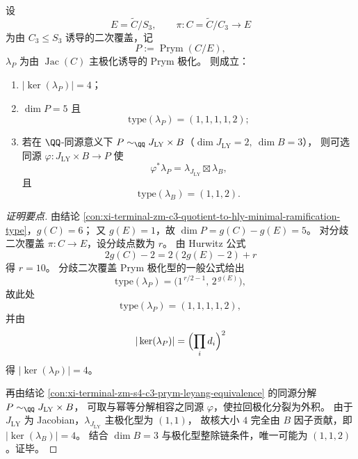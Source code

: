 \begin{conclusion}\label{con:xi-terminal-zm-prym-polarization-type-rigidity-11112}
设
\[
E=\widetilde{C}/S_3,\qquad
\pi:C=\widetilde{C}/C_3\longrightarrow E
\]
为由 \(C_3\le S_3\) 诱导的二次覆盖，记
\[
P:=\operatorname{Prym}(C/E),
\]
\(\lambda_P\) 为由 \(\operatorname{Jac}(C)\) 主极化诱导的 Prym 极化。
则成立：
\begin{enumerate}
  \item \(|\ker(\lambda_P)|=4\)；
  \item \(\dim P=5\) 且
  \[
  \mathrm{type}(\lambda_P)=(1,1,1,1,2);
  \]
  \item 若在 \(\QQ\)-同源意义下 \(P\sim_{\QQ}J_{\mathrm{LY}}\times B\)（\(\dim J_{\mathrm{LY}}=2,\ \dim B=3\)），
  则可选同源 \(\varphi:J_{\mathrm{LY}}\times B\to P\) 使
  \[
  \varphi^*\lambda_P=\lambda_{J_{\mathrm{LY}}}\boxtimes \lambda_B,
  \]
  且
  \[
  \mathrm{type}(\lambda_B)=(1,1,2).
  \]
\end{enumerate}
\end{conclusion}
\begin{proof}[证明要点]
由结论 \ref{con:xi-terminal-zm-c3-quotient-to-hly-minimal-ramification-type}，\(g(C)=6\)；
又 \(g(E)=1\)，故 \(\dim P=g(C)-g(E)=5\)。
对分歧二次覆盖 \(\pi:C\to E\)，设分歧点数为 \(r\)。
由 Hurwitz 公式
\[
2g(C)-2=2(2g(E)-2)+r
\]
得 \(r=10\)。
分歧二次覆盖 Prym 极化型的一般公式给出
\[
\mathrm{type}(\lambda_P)=\bigl(1^{\,r/2-1},\,2^{\,g(E)}\bigr),
\]
故此处
\[
\mathrm{type}(\lambda_P)=(1,1,1,1,2),
\]
并由
\[
|\ker(\lambda_P)|=\Bigl(\prod_i d_i\Bigr)^2
\]
得 \(|\ker(\lambda_P)|=4\)。

再由结论 \ref{con:xi-terminal-zm-s4-c3-prym-leyang-equivalence} 的同源分解
\(
P\sim_{\QQ}J_{\mathrm{LY}}\times B
\)，
可取与幂等分解相容之同源 \(\varphi\)，使拉回极化分裂为外积。
由于 \(J_{\mathrm{LY}}\) 为 Jacobian，\(\lambda_{J_{\mathrm{LY}}}\) 主极化型为 \((1,1)\)，
故核大小 \(4\) 完全由 \(B\) 因子贡献，即 \(|\ker(\lambda_B)|=4\)。
结合 \(\dim B=3\) 与极化型整除链条件，唯一可能为 \((1,1,2)\)。证毕。
\end{proof}


